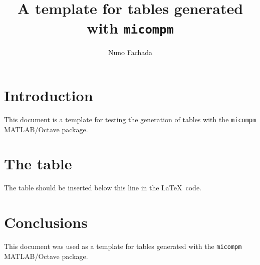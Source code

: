 \documentclass{article}
\title{A template for tables generated with \texttt{micompm}}
\author{Nuno Fachada}
\date{}
\begin{document}
\maketitle

\section{Introduction}

This document is a template for testing the generation of tables with the
\texttt{micompm} MATLAB/Octave package.

\section{The table}

The table should be inserted below this line in the \LaTeX\mbox{ }code.


\section{Conclusions}

This document was used as a template for tables generated with the
\texttt{micompm} MATLAB/Octave package.
\end{document}
